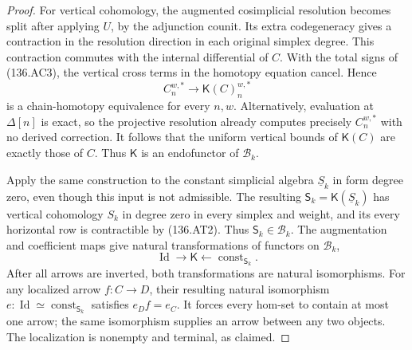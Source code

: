 \begin{proof}
For vertical cohomology, the augmented cosimplicial
resolution becomes split after applying $U$, by the
adjunction counit. Its extra codegeneracy gives a
contraction in the resolution direction in each
original simplex degree. This contraction commutes
with the internal differential of $C$. With the total
signs of (136.AC3), the vertical cross terms in the
homotopy equation cancel. Hence
\[
                C_n^{w,*}\longrightarrow
                         \mathsf K(C)_n^{w,*}
\]
is a chain-homotopy equivalence for every $n,w$.
Alternatively, evaluation at $\Delta[n]$ is exact,
so the projective resolution already computes precisely
$C_n^{w,*}$ with no derived correction. It follows
that the uniform vertical bounds of $\mathsf K(C)$
are exactly those of $C$. Thus $\mathsf K$ is an
endofunctor of $\mathcal B_k$.

Apply the same construction to the constant simplicial
algebra $\underline S_k$ in form degree zero, even
though this input is not admissible. The resulting
$\mathsf S_k=\mathsf K(\underline S_k)$ has vertical
cohomology $S_k$ in degree zero in every simplex and
weight, and its every horizontal row is contractible
by (136.AT2). Thus $\mathsf S_k\in\mathcal B_k$.
The augmentation and coefficient maps give natural
transformations of functors on $\mathcal B_k$,
\[
                 \operatorname{Id}\longrightarrow\mathsf K
                          \longleftarrow\operatorname{const}_{\mathsf S_k}.
                                                               \tag{136.AT4}
\]
After all arrows are inverted, both transformations
are natural isomorphisms. For any localized arrow
$f:C\to D$, their resulting natural isomorphism
$e:\operatorname{Id}\simeq\operatorname{const}_{\mathsf S_k}$
satisfies $e_Df=e_C$. It forces every hom-set to
contain at most one arrow; the same isomorphism
supplies an arrow between any two objects. The
localization is nonempty and terminal, as claimed.
\end{proof}
